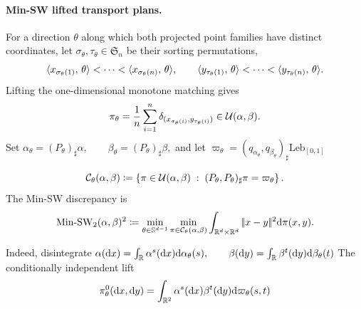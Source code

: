 \paragraph{Min-SW lifted transport plans.}
For a direction $\theta$ along which both projected point families have distinct coordinates, let $\sigma_\theta,\tau_\theta\in\mathfrak S_n$ be their sorting permutations,
\[
\langle x_{\sigma_\theta(1)},\,\theta\rangle<\cdots<
\langle x_{\sigma_\theta(n)},\,\theta\rangle,
\qquad
\langle y_{\tau_\theta(1)},\,\theta\rangle<\cdots<
\langle y_{\tau_\theta(n)},\,\theta\rangle.
\]
Lifting the one-dimensional monotone matching gives
\begin{equation}\label{eq-min-sw-empirical-plan}
\pi_\theta
=
\frac1n\sum_{i=1}^n
\delta_{(x_{\sigma_\theta(i)},y_{\tau_\theta(i)})}
\in\mathcal{U}(\alpha,\beta).
\end{equation}
Set
\(\alpha_\theta=(P_\theta)_\sharp\alpha, \qquad \beta_\theta=(P_\theta)_\sharp\beta,\)
and let
\(\varpi_\theta = (q_{\alpha_\theta},q_{\beta_\theta})_\sharp \mathrm{Leb}_{[0,1]}\)
\begin{defn}\label{def-min-sw}
\begin{equation}\label{eq-min-sw-constrained-lifts}
\mathcal C_\theta(\alpha,\beta)
\coloneqq
\left\{
\pi\in\mathcal{U}(\alpha,\beta)
\;:\;
(P_\theta,P_\theta)_\sharp\pi=\varpi_\theta
\right\}.
\end{equation}
The Min-SW discrepancy is
\begin{equation}\label{eq-min-sw-definition}
\operatorname{Min\text{-}SW}_2(\alpha,\beta)^2
\coloneqq
\min_{\theta\in\mathbb{S}^{d-1}}
\min_{\pi\in\mathcal C_\theta(\alpha,\beta)}
\int_{\mathbb{R}^d\times\mathbb{R}^d}|\!| x-y |\!|^2\mathrm{d}\pi(x,y).
\end{equation}
\end{defn}
Indeed, disintegrate
\(\alpha(\mathrm{d} x)=\int_{\mathbb{R}} \alpha^s(\mathrm{d} x)\mathrm{d}\alpha_\theta(s), \qquad \beta(\mathrm{d} y)=\int_{\mathbb{R}} \beta^t(\mathrm{d} y)\mathrm{d}\beta_\theta(t)\)
The conditionally independent lift
\begin{equation}\label{eq-min-sw-fiber-lift}
\pi_\theta^0(\mathrm{d} x,\mathrm{d} y)
=
\int_{\mathbb{R}^2}
\alpha^s(\mathrm{d} x)\beta^t(\mathrm{d} y)
\mathrm{d}\varpi_\theta(s,t)
\end{equation}
